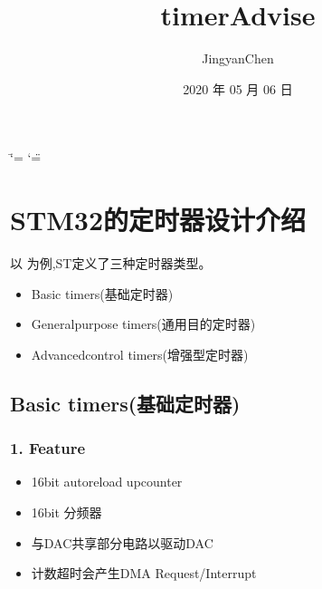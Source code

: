 \documentclass[letterpaper,10pt,english]{sphinxmanual}
\title{timerAdvise}
\date{2020 年 05 月 06 日}
\author{JingyanChen}
\begin{document}
\ifdefined\shorthandoff
  \ifnum\catcode`\=\string=\active\shorthandoff{=}\fi
  \ifnum\catcode`\"=\active{}\fi
\fi

\pagestyle{empty}
\sphinxmaketitle
\pagestyle{plain}
\sphinxtableofcontents
\pagestyle{normal}
\label{\detokenize{index::doc}}



\chapter{STM32的定时器设计介绍}
\label{\detokenize{STM32_u5b9a_u65f6_u5668_u8bbe_u8ba1_u4ecb_u7ecd/STM32_u7684_u5b9a_u65f6_u5668_u8bbe_u8ba1_u4ecb_u7ecd:stm32}}\label{\detokenize{STM32_u5b9a_u65f6_u5668_u8bbe_u8ba1_u4ecb_u7ecd/STM32_u7684_u5b9a_u65f6_u5668_u8bbe_u8ba1_u4ecb_u7ecd::doc}}
以  为例,ST定义了三种定时器类型。
\begin{itemize}
\item {} 
Basic timers(基础定时器)

\item {} 
General\sphinxhyphen{}purpose timers(通用目的定时器)

\item {} 
Advanced\sphinxhyphen{}control timers(增强型定时器)

\end{itemize}


\section{Basic timers(基础定时器)}
\label{\detokenize{STM32_u5b9a_u65f6_u5668_u8bbe_u8ba1_u4ecb_u7ecd/STM32_u7684_u5b9a_u65f6_u5668_u8bbe_u8ba1_u4ecb_u7ecd:basic-timers}}

\subsection{1. Feature}
\label{\detokenize{STM32_u5b9a_u65f6_u5668_u8bbe_u8ba1_u4ecb_u7ecd/STM32_u7684_u5b9a_u65f6_u5668_u8bbe_u8ba1_u4ecb_u7ecd:feature}}\begin{itemize}
\item {} 
16\sphinxhyphen{}bit auto\sphinxhyphen{}reload upcounter

\item {} 
16\sphinxhyphen{}bit 分频器

\item {} 
与DAC共享部分电路以驱动DAC

\item {} 
计数超时会产生DMA Request/Interrupt

\end{itemize}
\end{document}
